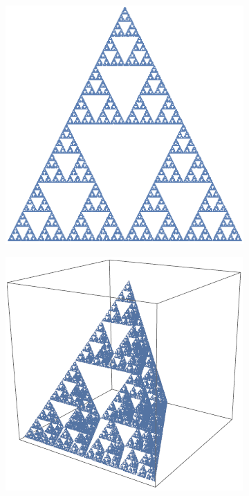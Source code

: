 \begin{figure}[h]
	\centering
	\begin{subfigure}{0.3\textwidth}
		\centering
		\includegraphics[width=0.85\linewidth]{pics/ch-upper-reg/sierp.png}
	\end{subfigure}%
	\begin{subfigure}{.3\textwidth}
		\centering
		\includegraphics[width=.9\linewidth]{pics/ch-upper-reg/sierptetra.png}
	\end{subfigure}%

\end{figure}
